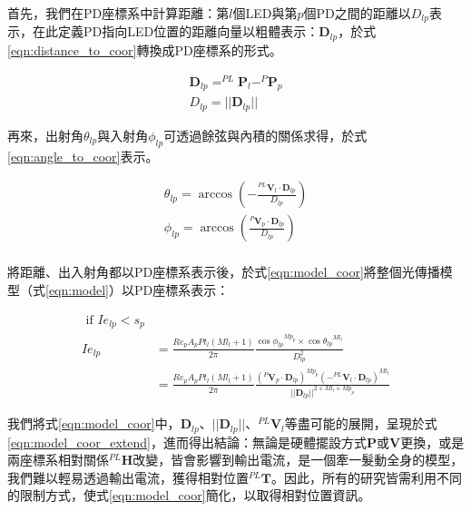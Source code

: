 \begin{description}
        \qquad
        首先，我們在PD座標系中計算距離：第$l$個LED與第$p$個PD之間的距離以$D_{lp}$表示，在此定義PD指向LED位置的距離向量以粗體表示：$\boldsymbol{D}_{lp}$，於式\ref{eqn:distance_to_coor}轉換成PD座標系的形式。
        
        \begin{equation}
            \label{eqn:distance_to_coor}
            \begin{aligned}
            \boldsymbol{D}_{lp} = ^{PL}\boldsymbol{P}_l- ^{P}\boldsymbol{P}_p \\
            D_{lp} = ||\boldsymbol{D}_{lp}||
            \end{aligned}
        \end{equation}

        \qquad
        再來，出射角$\theta_{lp}$與入射角$\phi_{lp}$可透過餘弦與內積的關係求得，於式\ref{eqn:angle_to_coor}表示。

        \begin{equation}
            \label{eqn:angle_to_coor}
            \begin{aligned}
            \theta_{lp} = \arccos(-\frac{^{PL}\boldsymbol{V}_l \cdot {\boldsymbol{D}_{lp}}}{D_{lp}})\\
            \phi_{lp} = \arccos(\frac{^{P}\boldsymbol{V}_p \cdot {\boldsymbol{D}_{lp}}}{D_{lp}})\\
            \end{aligned}
        \end{equation}

        \qquad
        將距離、出入射角都以PD座標系表示後，於式\ref{eqn:model_coor}將整個光傳播模型（式\ref{eqn:model}）以PD座標系表示：

        \begin{equation}
            \label{eqn:model_coor}
            \begin{aligned}
                \text { if } Ie_{lp}<s_p \\
                Ie_{lp} &= \frac{Re_pA_pPt_l(Ml_{l}+1)}{2 \pi} \frac{ {\cos\phi_{lp}}^{Mp_{p}} \times{\cos \theta_{lp}}^{Ml_{l}}}{D^2_{lp}}\\
                    & = \frac{Re_pA_pPt_l(Ml_{l}+1)}{2 \pi} \frac{ {{(^{P}\boldsymbol{V}_p \cdot {\boldsymbol{D}_{lp}})}}^{Mp_{p}} {(-^{PL}\boldsymbol{V}_l \cdot {\boldsymbol{D}_{lp}})}^{Ml_{l}}}  {{||{\boldsymbol{D}_{lp}}||}^{2+Ml_l+Mp_p}}
            \end{aligned}
        \end{equation}

        \qquad
        我們將式\ref{eqn:model_coor}中，${\boldsymbol{D}_{lp}}$、$||{\boldsymbol{D}_{lp}}||$、$^{PL}\boldsymbol{V}_l$等盡可能的展開，呈現於式\ref{eqn:model_coor_extend}，進而得出結論：無論是硬體擺設方式$\boldsymbol{P}$或$\boldsymbol{V}$更換，或是兩座標系相對關係$^{PL}\boldsymbol{H}$改變，皆會影響到輸出電流，是一個牽一髮動全身的模型，我們難以輕易透過輸出電流，獲得相對位置$^{PL}\boldsymbol{T}$。因此，所有的研究皆需利用不同的限制方式，使式\ref{eqn:model_coor}簡化，以取得相對位置資訊。



\end{description}
